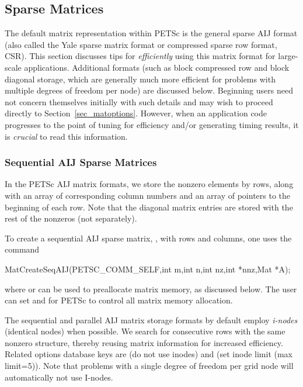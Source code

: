 \subsection{Sparse Matrices}
\label{sec_matsparse}

 
The default matrix representation within PETSc is the general sparse
AIJ format (also called the Yale sparse matrix format or compressed
sparse row format, CSR).  This section discusses tips for {\em
efficiently} using this matrix format for large-scale
applications. Additional formats (such as block compressed row and
block diagonal storage, which are generally much more efficient for
problems with multiple degrees of freedom per node) are discussed
below.  Beginning users need not concern themselves initially with
such details and may wish to proceed directly to
Section~\ref{sec_matoptions}.  However, when an application code
progresses to the point of tuning for efficiency and/or generating
timing results, it is {\em crucial} to read this information.

\subsubsection{Sequential AIJ Sparse Matrices}

In the PETSc AIJ matrix formats, we store the nonzero elements
by rows, along with an array of corresponding column numbers and
an array of pointers to the beginning of each row.  Note that the
diagonal matrix entries are stored with the rest of the nonzeros (not
separately). 

To create a sequential AIJ sparse matrix, , 
 with  rows and  columns,
one uses the command
\begin{tabbing}
  MatCreateSeqAIJ(PETSC\_COMM\_SELF,int m,int n,int nz,int *nnz,Mat *A);
\end{tabbing}
where  or  can be used to preallocate matrix memory,
as discussed below. The user can set  and  for PETSc to control all matrix memory allocation.

The sequential and parallel AIJ matrix storage formats by default
employ {\em i-nodes} (identical nodes) when possible.  We search for
consecutive rows with the same nonzero structure, thereby reusing
matrix information for increased efficiency.  Related options database
keys are  (do not use inodes) and  (set inode limit (max limit=5)).
Note that problems with a single degree of freedom per grid node
will automatically not use I-nodes.

